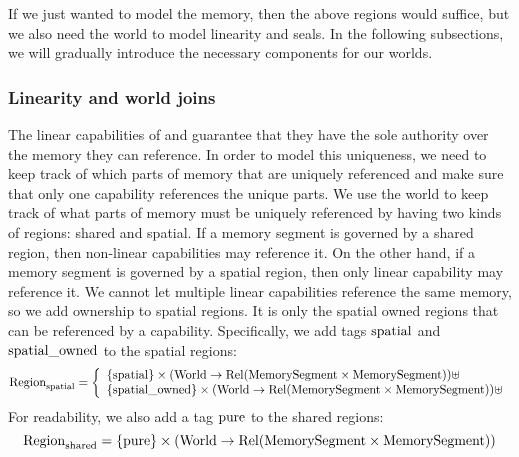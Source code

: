 \begin{jversion}
If we just wanted to model the memory, then the above regions would suffice, but we also need the world to model linearity and seals.
In the following subsections, we will gradually introduce the necessary components for our worlds.

\subsubsection{Linearity and world joins}
The linear capabilities of \srccm{} and \trgcm{} guarantee that they have the sole authority over the memory they can reference.
In order to model this uniqueness, we need to keep track of which parts of memory that are uniquely referenced and make sure that only one capability references the unique parts.
We use the world to keep track of what parts of memory must be uniquely referenced by having two kinds of regions: shared and spatial.
If a memory segment is governed by a shared region, then non-linear capabilities may reference it.
On the other hand, if a memory segment is governed by a spatial region, then only linear capability may reference it.
We cannot let multiple linear capabilities reference the same memory, so we add ownership to spatial regions.
It is only the spatial owned regions that can be referenced by a capability.
Specifically, we add tags $\mathrm{spatial}$ and $\mathrm{spatial\_owned}$ to the spatial regions:
\[
  \mathrm{Region}_\mathrm{spatial} = \left\{
  \begin{array}{l}
    \{\mathrm{spatial} \} \times (\mathrm{World} \rightarrow \mathrm{Rel}(\mathrm{MemorySegment} \times \mathrm{MemorySegment})) \uplus \\
    \{\mathrm{spatial\_owned} \} \times (\mathrm{World} \rightarrow \mathrm{Rel}(\mathrm{MemorySegment} \times \mathrm{MemorySegment}))\uplus \\ 
  \end{array} \right.
\]
For readability, we also add a tag $\mathrm{pure}$ to the shared regions:
\[
  \mathrm{Region}_\mathrm{shared} = \{\mathrm{pure} \} \times (\mathrm{World} \rightarrow \mathrm{Rel}(\mathrm{MemorySegment} \times \mathrm{MemorySegment})) 
\]


\end{jversion}
